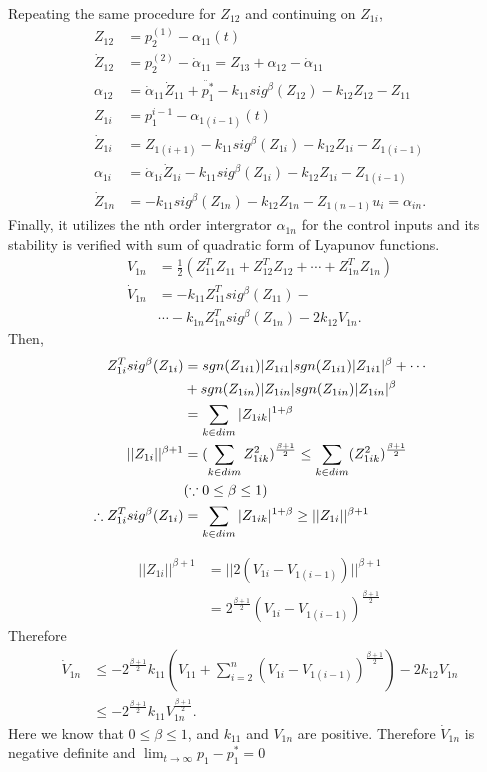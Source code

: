  Repeating the same procedure for $Z_{12}$ and continuing on $Z_{1i}$,
 \begin{align*} 
    Z_{12} &= p_2^{(1)} - \alpha_{11} (t)\\
    \dot Z_{12} &= p_2^{(2)} - \dot \alpha_{11}  = Z_{13} + \alpha_{12} - \dot \alpha_{11}\\
    \alpha_{12} &= \dot \alpha_{11} \dot Z_{11} + \ddot{p_1^*} - k_{11} sig^{\beta}(Z_{12}) - k_{12} Z_{12} - Z_{11}\\
    Z_{1i} &= p_1^{i-1} - \alpha_{1(i-1)} (t)\\
    \dot Z_{1i} &= Z_{1(i+1)} - k_{11} sig^{\beta}(Z_{1i}) - k_{12} Z_{1i} - Z_{1(i-1)}\\
    \alpha_{1i} &=  \dot \alpha_{1i} \dot Z_{1i} - k_{11} sig^{\beta}(Z_{1i}) - k_{12} Z_{1i} - Z_{1(i-1)} \\
    \dot Z_{1n} &= - k_{11} sig^{\beta}(Z_{1n}) - k_{12} Z_{1n} - Z_{1(n-1)}
    u_i = \alpha_{in}.
 \end{align*}
 Finally, it utilizes the nth order intergrator $\alpha_{1n}$ for the control inputs and its stability is verified with sum of quadratic form of Lyapunov functions. 
 \begin{align*}
    V_{1n} &= \frac{1}{2} (Z_{11}^TZ_{11} + Z_{12}^TZ_{12} + \cdots + Z_{1n}^TZ_{1n})\\
    \dot V_{1n} &= -k_{11}Z_{11}^T sig^{\beta}(Z_{11}) - \\
    &\cdots -k_{1n}Z_{1n}^T sig^{\beta}(Z_{1n}) - 2k_{12}V_{1n}.
 \end{align*}
 Then, 
 \begin{align*}
    Z_{1i}^T sig^{\beta}(Z_{1i}) &= sgn(Z_{1i1})|Z_{1i1}| sgn(Z_{1i1})|Z_{1i1}|^{\beta} + \cdots \bigskip\\
    &+ sgn(Z_{1in})|Z_{1in}| sgn(Z_{1in})|Z_{1in}|^{\beta}\\
    &=\sum_{k \in dim}|Z_{1ik}| ^{1+\beta} \\
    ||Z_{1i}||^{\beta +1} &= (\sum_{k \in dim}Z_{1ik} ^{2})^{\frac{\beta +1}{2}} \leq \sum_{k \in dim}(Z_{1ik} ^{2})^{\frac{\beta +1}{2}}\\ 
    &(\because 0 \leq \beta \leq 1)\\
    \therefore Z_{1i}^T sig^{\beta}(Z_{1i}) & = \sum_{k \in dim}|Z_{1ik}| ^{1+\beta}   \geq ||Z_{1i}||^{\beta +1}
 \end{align*}
 
 \begin{align*}
    ||Z_{1i}||^{\beta +1} &= ||2(V_{1i} - V_{1(i-1)})||^{\beta + 1}\\
    &=2^{\frac{\beta + 1}{2}} (V_{1i} - V_{1(i-1)})^{\frac{\beta + 1}{2}}
 \end{align*}
    Therefore
\begin{align*}
    \dot V_{1n} &\leq - 2^{\frac{\beta + 1}{2}} k_{11}( V_{11} + \sum_{i = 2}^{n}  (V_{1i} - V_{1(i-1)})^{\frac{\beta + 1}{2}} )- 2k_{12}V_{1n}\\
    &\leq - 2^{\frac{\beta + 1}{2}} k_{11}  V_{1n}^{\frac{\beta + 1}{2}}.
\end{align*}
Here we know that $0 \leq \beta \leq 1$, and $k_{11}$ and $V_{1n}$ are positive. Therefore $\dot V_{1n}$ is negative definite and $\lim_{t\rightarrow \infty} p_1 - p_1^* = 0$